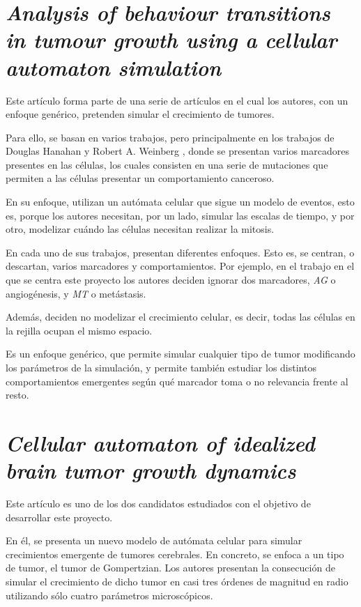 \section{\textit{Analysis of behaviour transitions in tumour growth
using a cellular automaton simulation}}

Este artículo \cite{jsantos-amonteagudo-1-2014} forma parte de una serie de artículos
\cite{jsantos-amonteagudo-2012} \cite{jsantos-amonteagudo-2013} \cite{jsantos-amonteagudo-2015}
en el cual los autores, con un enfoque genérico, pretenden simular el crecimiento de
tumores.

Para ello, se basan en varios trabajos, pero principalmente en los trabajos de Douglas Hanahan y Robert A. Weinberg
\cite{hanahan-weinberg-2000} \cite{hanahan-weinberg-2011}, donde se presentan varios marcadores presentes
en las células, los cuales consisten en una serie de mutaciones que permiten a las células presentar
un comportamiento canceroso.

En su enfoque, utilizan un autómata celular que sigue un modelo de eventos, esto es, porque los autores
necesitan, por un lado, simular las escalas de tiempo, y por otro, modelizar cuándo las células necesitan
realizar la mitosis.

En cada uno de sus trabajos, presentan diferentes enfoques. Esto es, se centran, o descartan, varios marcadores y
comportamientos. Por ejemplo, en el trabajo en el que se centra este proyecto \cite{jsantos-amonteagudo-1-2014}
los autores deciden ignorar dos marcadores, \textit{AG} o angiogénesis, y \textit{MT} o metástasis.

Además, deciden no modelizar el crecimiento celular, es decir, todas las células en la rejilla ocupan
el mismo espacio.

Es un enfoque genérico, que permite simular cualquier tipo de tumor modificando los parámetros de la
simulación, y permite también estudiar los distintos comportamientos emergentes según
qué marcador toma o no relevancia frente al resto.

\section{\textit{Cellular automaton of idealized brain tumor growth dynamics}}

Este artículo \cite{kansal-torquato} es uno de los dos candidatos estudiados con el objetivo
de desarrollar este proyecto.

En él, se presenta un nuevo modelo de autómata celular para simular crecimientos emergente de tumores cerebrales.
En concreto, se enfoca a un tipo de tumor, el tumor de Gompertzian. Los autores presentan
la consecución de simular el crecimiento de dicho tumor en casi tres órdenes de magnitud en radio
utilizando sólo cuatro parámetros microscópicos.

